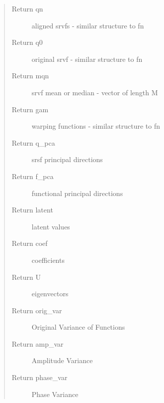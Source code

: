 \documentclass[letterpaper,10pt,english]{sphinxmanual}
\begin{document}
\begin{fulllineitems}
\begin{quote}
\begin{description}
\item[{Return qn}] \leavevmode
aligned srvfs - similar structure to fn

\item[{Return q0}] \leavevmode
original srvf - similar structure to fn

\item[{Return mqn}] \leavevmode
srvf mean or median - vector of length M

\item[{Return gam}] \leavevmode
warping functions - similar structure to fn

\item[{Return q\_pca}] \leavevmode
srsf principal directions

\item[{Return f\_pca}] \leavevmode
functional principal directions

\item[{Return latent}] \leavevmode
latent values

\item[{Return coef}] \leavevmode
coefficients

\item[{Return U}] \leavevmode
eigenvectors

\item[{Return orig\_var}] \leavevmode
Original Variance of Functions

\item[{Return amp\_var}] \leavevmode
Amplitude Variance

\item[{Return phase\_var}] \leavevmode
Phase Variance

\end{description}\end{quote}

\end{fulllineitems}

\end{document}
